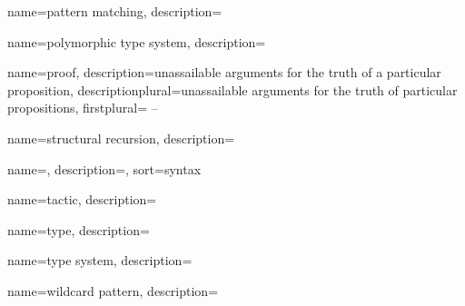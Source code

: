 {
  name={pattern matching},
  description={}
}

{
  name={polymorphic type system},
  description={}
}

{
  name={proof},
  description={unassailable arguments for the truth of a particular
  proposition},
  descriptionplural={unassailable arguments for the truth of particular
  propositions},
  firstplural={ -- }
}


{
  name={structural recursion},
  description={}
}

{
  name=,
  description={},
  sort={syntax}
}

{
  name={tactic},
  description={}
}

{
  name={type},
  description={}
}

{
  name={type system},
  description={}
}

{
  name={wildcard pattern},
  description={}
}
